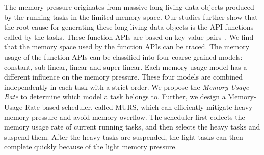 The memory pressure originates from massive long-living data objects produced by the running tasks in the limited memory space. Our studies further show that the root cause for generating these long-living data objects is the API functions called by the tasks. These function APIs are based on key-value pairs~\cite{dean2008mapreduce, zaharia2012resilient, hueske2012opening, isard2007dryad}. We find that the memory space used by the function APIs can be traced. The memory usage of the function APIs can be classified into four coarse-grained models: constant, sub-linear, linear and super-linear. Each memory usage model has a different influence on the memory pressure. 
These four models are combined independently in each task with a strict order. We propose the \textit{Memory Usage Rate} to determine which model a task belongs to. Further, we design a Memory-Usage-Rate based scheduler, called MURS, which can efficiently mitigate heavy memory pressure and avoid memory overflow. The scheduler first collects the memory usage rate of current running tasks, and then selects the heavy tasks and suspend them. After the heavy tasks are suspended, the light tasks can then complete quickly because of the light memory pressure. 


